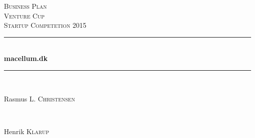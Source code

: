 \documentclass[12pt]{article}
\begin{document}
\begin{titlepage}

\newcommand{\HRule}{\rule{\linewidth}{0.5mm}} %

\center %
 

\textsc{\LARGE Business Plan}\\[1.5cm] %
\textsc{\Large Venture Cup}\\[0.5cm] %
\textsc{\large Startup Competetion 2015}\\[0.5cm] %


\HRule \\[0.4cm]
{ \huge \bfseries macellum.dk}\\[0.4cm] %
\HRule \\[1.5cm]
 

\begin{minipage}{0.4\textwidth}
\begin{flushleft} \large
Rasmus L. \textsc{Christensen} %
\end{flushleft}
\end{minipage}
~
\begin{minipage}{0.4\textwidth}
\begin{flushright} \large
Henrik \textsc{Klarup} %
\end{flushright}
\end{minipage}\\[2cm]



\end{titlepage}
\end{document}
